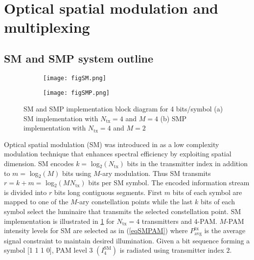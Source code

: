 \section{Optical spatial modulation and multiplexing}
\label{sec:osm}

\graphicspath{{_MIMOSpace/figures_osm/}}

\subsection{SM and SMP system outline}
\label{subsec:osmSystem}

\begin{figure}[t]
	\centering
		\begin{subfigure}{0.49\textwidth}
		\centering
				\texttt{[image: figSM.png]}
		\caption{}
		\label{figSM}			
		\end{subfigure}
		\hfill
		\begin{subfigure}{0.49\textwidth}
		\centering
				\texttt{[image: figSMP.png]}
				\caption{}
				\label{figSMP}
		\end{subfigure}
\caption[SM and SMP implementation block diagram]{SM and SMP implementation block diagram for 4 bits/symbol (a) SM implementation with $N_{\text{tx}} = 4$ and $M = 4$ (b) SMP implementation with $N_{\text{tx}} = 4$ and $M = 2$}
	\label{fig:SpatialModulation}
\end{figure}

Optical spatial modulation (SM) was introduced in \cite{mes06a} as a low complexity modulation technique that enhances spectral efficiency by exploiting spatial dimension. SM encodes $k =$ log$^{ }_{2}(N_{\text{tx}})$ bits in the transmitter index in addition to $m=$ log$^{ }_{2}(M)$ bits using $M$-ary modulation. Thus SM transmits $r=k+m=$ log$^{ }_{2}(MN_{\text{tx}})$ bits per SM symbol. The encoded information stream is divided into $r$ bits long contiguous segments. First $m$ bits of each symbol are mapped to one of the $M$-ary constellation points while the last $k$ bits of each symbol select the luminaire that transmits the selected constellation point. SM implementation is illustrated in \figurename{ \ref{figSM}} for $N_{\text{tx}}=4$ transmitters and 4-PAM. $M$-PAM intensity levels for SM are selected as in (\ref{eqSMPAM}) where $P^{\text{tx}}_{\text{avg}}$ is the average signal constraint to maintain desired illumination. Given a bit sequence forming a symbol [1 1 1 0], PAM level 3 $(I_4^{\text{SM}})$ is radiated using transmitter index $2$.

